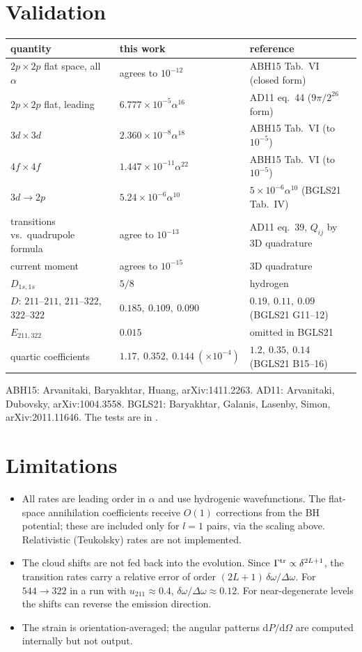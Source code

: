 \documentclass[11pt]{article}
\newcommand{\dd}{\mathrm{d}}
\newcommand{\code}[1]{\path{#1}}
\begin{document}
\section{Validation}
\begin{center}
\small
\begin{tabular}{@{}p{}p{}p{}@{}}
\toprule
quantity & this work & reference\\
\midrule
$2p\times2p$ flat space, all $\alpha$ & agrees to $10^{-12}$ & ABH15 Tab.~VI (closed form)\\
$2p\times2p$ flat, leading & $6.777\times10^{-5}\alpha^{16}$ & AD11 eq.~44 ($9\pi/2^{26}$ form)\\
$3d\times3d$ & $2.360\times10^{-8}\alpha^{18}$ & ABH15 Tab.~VI (to $10^{-5}$)\\
$4f\times4f$ & $1.447\times10^{-11}\alpha^{22}$ & ABH15 Tab.~VI (to $10^{-5}$)\\
$3d\to2p$ & $5.24\times10^{-6}\alpha^{10}$ & $5\times10^{-6}\alpha^{10}$ (BGLS21 Tab.~IV)\\
transitions vs.\ quadrupole formula & agree to $10^{-13}$ & AD11 eq.~39, $Q_{ij}$ by 3D quadrature\\
current moment & agrees to $10^{-15}$ & 3D quadrature\\
$D_{1s,1s}$ & $5/8$ & hydrogen\\
$D$: $211$--$211$, $211$--$322$, $322$--$322$ & $0.185,\ 0.109,\ 0.090$ & $0.19,\ 0.11,\ 0.09$ (BGLS21 G11--12)\\
$E_{211,322}$ & $0.015$ & omitted in BGLS21\\
quartic coefficients & $1.17,\ 0.352,\ 0.144\ (\times10^{-4})$ & $1.2,\ 0.35,\ 0.14$ (BGLS21 B15--16)\\
\bottomrule
\end{tabular}
\end{center}
ABH15: Arvanitaki, Baryakhtar, Huang, arXiv:1411.2263. AD11: Arvanitaki, Dubovsky, arXiv:1004.3558. BGLS21: Baryakhtar, Galanis, Lasenby, Simon, arXiv:2011.11646. The tests are in \code{test/test_gw_rates.jl}.

\section{Limitations}
\begin{itemize}
\item All rates are leading order in $\alpha$ and use hydrogenic wavefunctions. The flat-space annihilation coefficients receive $O(1)$ corrections from the BH potential; these are included only for $l=1$ pairs, via the scaling above. Relativistic (Teukolsky) rates are not implemented.
\item The cloud shifts are not fed back into the evolution. Since $\Gamma^{\rm tr}\propto\delta^{2L+1}$, the transition rates carry a relative error of order $(2L+1)\,\delta\omega/\Delta\omega$. For $544\to322$ in a run with $u_{211}\approx0.4$, $\delta\omega/\Delta\omega\approx0.12$. For near-degenerate levels the shifts can reverse the emission direction.
\item The strain is orientation-averaged; the angular patterns $\dd P/\dd\Omega$ are computed internally but not output.
\end{itemize}
\end{document}
